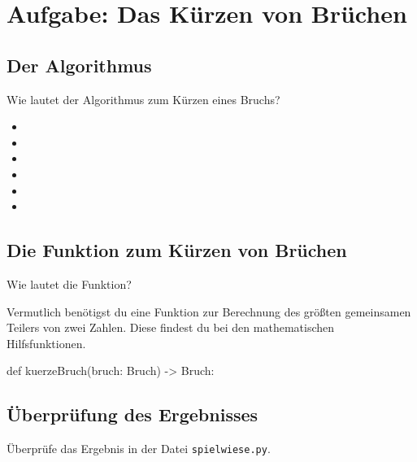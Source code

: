 \section{Aufgabe: Das Kürzen von Brüchen}

\subsection*{Der Algorithmus}

Wie lautet der Algorithmus zum Kürzen eines Bruchs?

{\Large
\begin{itemize}
	\item  
	\item  
	\item  
	\item  
	\item  
	\item  
\end{itemize}
}

\subsection*{Die Funktion zum Kürzen von Brüchen}

Wie lautet die Funktion?

Vermutlich benötigst du eine Funktion zur Berechnung des größten gemeinsamen Teilers von zwei Zahlen. Diese findest du bei den mathematischen Hilfsfunktionen.

\begin{codePython}
def kuerzeBruch(bruch: Bruch) -> Bruch:
\end{codePython}


\subsection*{Überprüfung des Ergebnisses}

Überprüfe das Ergebnis in der Datei \texttt{spielwiese.py}.